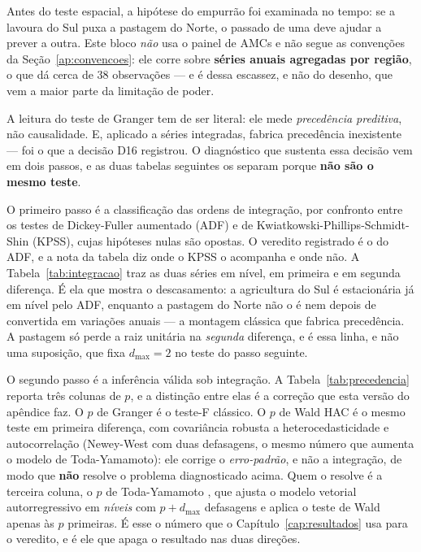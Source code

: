 Antes do teste espacial, a hipótese do empurrão foi examinada no tempo: se a
lavoura do Sul puxa a pastagem do Norte, o passado de uma deve ajudar a prever
a outra. Este bloco \emph{não} usa o painel de AMCs e não segue as convenções
da Seção~\ref{ap:convencoes}: ele corre sobre \textbf{séries anuais agregadas
por região}, o que dá cerca de 38 observações --- e é dessa escassez, e não do
desenho, que vem a maior parte da limitação de poder.

A leitura do teste de Granger tem de ser literal: ele mede \emph{precedência
preditiva}, não causalidade. E, aplicado a séries integradas, fabrica
precedência inexistente --- foi o que a decisão D16 registrou. O diagnóstico
que sustenta essa decisão vem em dois passos, e as duas tabelas seguintes os
separam porque \textbf{não são o mesmo teste}.

O primeiro passo é a classificação das ordens de integração, por confronto
entre os testes de Dickey-Fuller aumentado (ADF) e de
Kwiatkowski-Phillips-Schmidt-Shin (KPSS), cujas hipóteses nulas são opostas. O
veredito registrado é o do ADF, e a nota da tabela diz onde o KPSS o acompanha
e onde não. A Tabela~\ref{tab:integracao} traz as duas séries em nível, em
primeira e em segunda diferença. É ela que mostra o descasamento: a agricultura
do Sul é estacionária já em nível pelo ADF, enquanto a pastagem do Norte não o
é nem depois de convertida em variações anuais --- a montagem clássica que
fabrica precedência. A pastagem só perde a raiz unitária na \emph{segunda}
diferença, e é essa linha, e não uma suposição, que fixa \(d_{\max} = 2\) no
teste do passo seguinte.

O segundo passo é a inferência válida sob integração. A
Tabela~\ref{tab:precedencia} reporta três colunas de \(p\), e a distinção entre
elas é a correção que esta versão do apêndice faz. O \(p\) de Granger é o
teste-F clássico. O \(p\) de Wald HAC é o mesmo teste em primeira diferença,
com covariância robusta a heterocedasticidade e autocorrelação (Newey-West com
duas defasagens, o mesmo número que aumenta o modelo de Toda-Yamamoto): ele
corrige o \emph{erro-padrão}, e não a integração, de modo que \textbf{não}
resolve o problema diagnosticado acima. Quem o resolve é a terceira coluna, o \(p\) de
Toda-Yamamoto \cite{TodaYamamoto1995}, que ajusta o modelo vetorial
autorregressivo em \emph{níveis} com \(p + d_{\max}\) defasagens e aplica o
teste de Wald apenas às \(p\) primeiras. É esse o número que o
Capítulo~\ref{cap:resultados} usa para o veredito, e é ele que apaga o
resultado nas duas direções.

